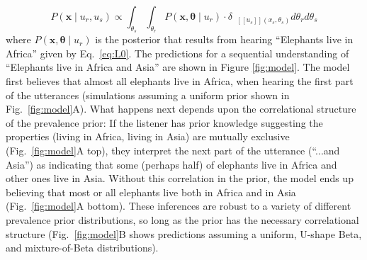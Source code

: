 \documentclass[10pt,letterpaper]{article}
\newcommand{\denote}[1]{\mbox{ $[\![ #1 ]\!]$}}
\begin{document}
\begin{equation}
P(\textbf{x} \mid u_{r}, u_{s}) \propto  \int_{\theta_s} \int_{\theta_r}P(\textbf{x}, \boldsymbol{\theta} \mid u_{r})  \cdot \delta_{\denote{u_{s}}(x_{s}, \theta_{s})} d\theta_r d\theta_s%
\label{eq:L0a}
\end{equation}
\noindent where $P(\textbf{x}, \boldsymbol{\theta} \mid u_{r})$  is the posterior that results from hearing ``Elephants live in Africa'' given by Eq.~\ref{eq:L0}.
The predictions for a sequential understanding of ``Elephants live in Africa and Asia'' are shown in Figure \ref{fig:model}.
The model first believes that almost all elephants live in Africa, when hearing the first part of the utterances (simulations assuming a uniform prior shown in Fig.~\ref{fig:model}A). 
What happens next depends upon the correlational structure of the prevalence prior: If the listener has prior knowledge suggesting the properties (living in Africa, living in Asia) are mutually exclusive (Fig.~\ref{fig:model}A top), they interpret the next part of the utterance (``...and Asia'') as indicating that some (perhaps half) of elephants live in Africa and other ones live in Asia. 
Without this correlation in the prior, the model ends up believing that most or all elephants live both in Africa and in Asia  (Fig.~\ref{fig:model}A bottom).
These inferences are robust to a variety of different prevalence prior distributions, so long as the prior has the necessary correlational structure (Fig.~\ref{fig:model}B shows predictions assuming a uniform, U-shape Beta, and mixture-of-Beta distributions).

\end{document}
